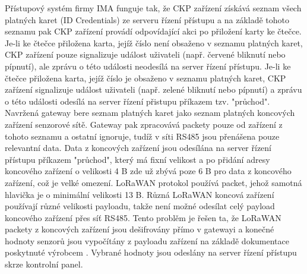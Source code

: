 Přístupový systém firmy IMA funguje tak, že CKP zařízení získává seznam všech platných karet (ID Credentials) ze serveru řízení přístupu a na základě tohoto seznamu pak CKP zařízení provádí odpovídající akci po přiložení karty ke čtečce. 
Je-li ke čtečce přiložena karta, jejíž číslo není obsaženo v seznamu platných karet, CKP zařízení pouze signalizuje událost uživateli (např. červené bliknutí nebo pípnutí), ale zprávu o této události neodesílá na server řízení přístupu. Je-li ke čtečce přiložena karta, jejíž číslo je obsaženo v seznamu platných karet, CKP zařízení signalizuje událost uživateli (např. zelené bliknutí nebo pípnutí) a zprávu o této události odesílá na server řízení přistupu příkazem tzv. "průchod".
Navržená gateway bere seznam platných karet jako seznam platných koncových zařízení senzorové sítě. Gateway pak zpracovává packety pouze od zařízení z tohoto seznamu a ostatní ignoruje, tudíž v síti RS485 jsou přenášena pouze relevantní data.
Data z koncových zařízení jsou odesílána na server řízení přístupu příkazem "průchod", který má fixní velikost a po přidání adresy koncového zařízení o velikosti 4 B zde už zbývá poze 6 B pro data z koncového zařízení, což je velké omezení.
LoRaWAN protokol používá packet, jehož samotná hlavička je o minimální velikosti 13 B. 
Různá LoRaWAN koncová zařízení používají různé velikosti payloadu, takže není možné odesílat celý payload koncového zařízení přes síť RS485.
Tento problěm je řešen ta, že LoRaWAN packety z koncových zařízení jsou dešifrovány přímo v gatewayi a konečné hodnoty senzorů jsou vypočítány z payloadu zařízení na základě dokumentace poskytnuté výrobcem \cite{RHF1S001 pdf}. Vybrané hodnoty jsou odeslány na server řízení přístupu skrze kontrolní panel. 


